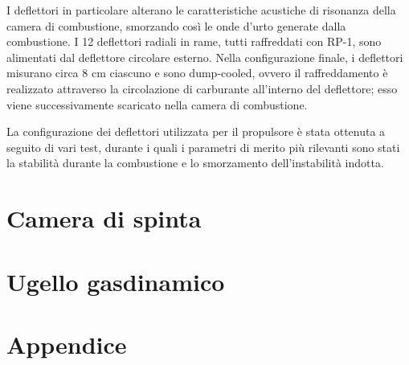 \documentclass[11pt,a4paper]{article}
\begin{document}
I deflettori in particolare alterano le caratteristiche acustiche di risonanza della camera di combustione, smorzando così le onde d’urto generate dalla combustione. I 12 deflettori radiali in rame, tutti raffreddati con RP-1, sono alimentati dal deflettore circolare esterno. Nella configurazione finale, i deflettori misurano circa 8 cm ciascuno e sono dump-cooled, ovvero il raffreddamento è realizzato attraverso la circolazione di carburante all’interno del deflettore; esso viene successivamente scaricato nella camera di combustione.

La configurazione dei deflettori utilizzata per il propulsore è stata ottenuta a seguito di vari test, durante i quali i parametri di merito più rilevanti sono stati la stabilità durante la combustione e lo smorzamento dell’instabilità indotta.




\section{Camera di spinta}

\label{sec:camera di spinta}




\section{Ugello gasdinamico}

\label{sec:ugello}




\section{Appendice}

\label{sec:appendice}
\end{document}
